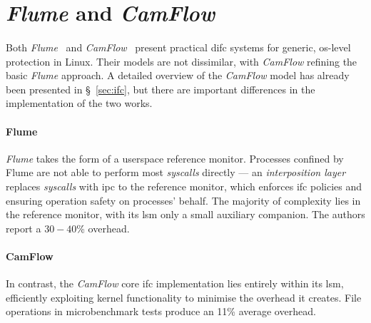 

\section{\textit{Flume} and \textit{CamFlow}}

\paragraph{} Both \textit{Flume}~\cite{flume} and \textit{CamFlow}~\cite{camflow} present practical \acrshort{difc} systems for generic, \acrshort{os}-level protection in Linux. Their models are not dissimilar, with \textit{CamFlow} refining the basic \textit{Flume} approach. A detailed overview of the \textit{CamFlow} model has already been presented in §~\ref{sec:ifc}, but there are important differences in the implementation of the two works.

\paragraph{Flume} \textit{Flume} takes the form of a userspace reference monitor. Processes confined by Flume are not able to perform most \textit{syscalls} directly --- an \textit{interposition layer} replaces \textit{syscalls} with \acrfull{ipc} to the reference monitor, which enforces \acrshort{ifc} policies and ensuring operation safety on processes' behalf. The majority of complexity lies in the reference monitor, with its \acrshort{lsm} only a small auxiliary companion. The authors report a $30-40$\% overhead.

\paragraph{CamFlow} In contrast, the \textit{CamFlow} core \acrshort{ifc} implementation lies entirely within its \acrshort{lsm}, efficiently exploiting kernel functionality to minimise the overhead it creates. File operations in microbenchmark tests produce an 11\% average overhead.


